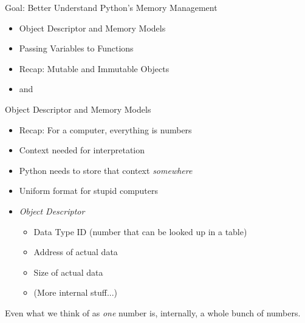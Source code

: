 
\begin{frame}[t,plain]
\titlepage
\end{frame}


\begin{frame}[fragile]{Goal: Better Understand Python's Memory Management}
%
\begin{itemize}
\item Object Descriptor and Memory Models
\item Passing Variables to Functions
\item Recap: Mutable and Immutable Objects
\item {} and 
\end{itemize}
%
\end{frame}


\begin{frame}[fragile]{Object Descriptor and Memory Models}
%
\begin{itemize}
\item Recap: For a computer, everything is numbers
\item Context needed for interpretation
\item Python needs to store that context \emph{somewhere}
\item Uniform format for stupid computers
\item \emph{Object Descriptor}
	\begin{itemize}
	\item Data Type ID (number that can be looked up in a table)
	\item Address of actual data
	\item Size of actual data
	\item (More internal stuff...)
	\end{itemize}
\end{itemize}
%
\begin{hintbox}
Even what we think of as \emph{one} number is, internally, a whole bunch of numbers.
\end{hintbox}
%
\end{frame}


